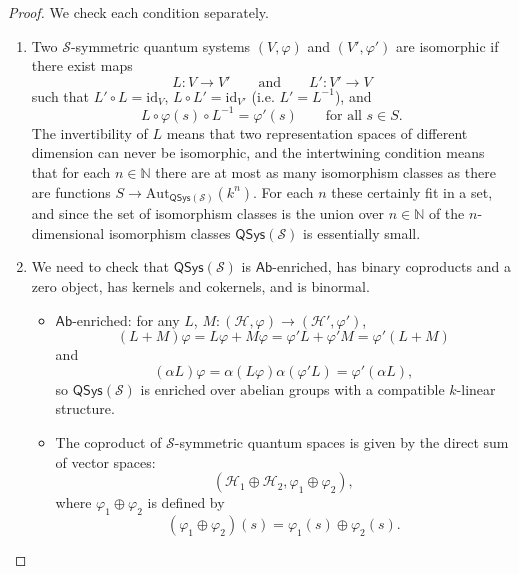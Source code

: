 \documentclass[a4paper,10pt]{scrreprt}
\newcommand{\N}{\mathbb{N}}
\newcommand{\Aut}{\mathrm{Aut}}
\theoremstyle{definition}
\theoremstyle{plain}
\theoremstyle{remark}
\begin{document}
\begin{proof}
  We check each condition separately.
  \begin{enumerate}
    \item Two $\mathcal{S}$-symmetric quantum systems $(V, \varphi)$ and $(V', \varphi')$ are isomorphic if there exist maps 
      \begin{equation*}
        L\colon V \to V' \qquad\text{and}\qquad L'\colon V' \to V
      \end{equation*}
      such that $L' \circ L = \mathrm{id}_{V}$, $L \circ L' = \mathrm{id}_{V'}$ (i.e. $L' = L^{-1}$), and
      \begin{equation*}
        L \circ \varphi(s) \circ L^{-1} = \varphi'(s)\qquad \text{for all }s \in S.
      \end{equation*}
      The invertibility of $L$ means that two representation spaces of different dimension can never be isomorphic, and the intertwining condition means that for each $n \in \N$ there are at most as many isomorphism classes as there are functions $S \to \Aut_{\mathsf{QSys}(\mathcal{S})}(k^{n})$. For each $n$ these certainly fit in a set, and since the set of isomorphism classes is the union over $n \in \N$ of the $n$-dimensional isomorphism classes $\mathsf{QSys}(\mathcal{S})$ is essentially small.

    \item We need to check that $\mathsf{QSys}(\mathcal{S})$ is $\mathsf{Ab}$-enriched, has binary coproducts and a zero object, has kernels and cokernels, and is binormal.
      \begin{itemize}
        \item $\mathsf{Ab}$-enriched: for any $L$, $M\colon (\mathscr{H}, \varphi) \to (\mathscr{H}', \varphi')$, 
          \begin{equation*}
            (L+M)\varphi = L\varphi + M\varphi = \varphi'L + \varphi'M = \varphi'(L+M)
          \end{equation*}
          and
          \begin{equation*}
            (\alpha L)\varphi = \alpha (L\varphi) \alpha(\varphi'L) = \varphi' (\alpha L),
          \end{equation*}
          so $\mathsf{QSys}(\mathcal{S})$ is enriched over abelian groups with a compatible $k$-linear structure.

        \item The coproduct of $\mathcal{S}$-symmetric quantum spaces is given by the direct sum of vector spaces:
          \begin{equation*}
            (\mathscr{H}_{1} \oplus \mathscr{H}_{2}, \varphi_{1} \oplus \varphi_{2}),
          \end{equation*}
          where $\varphi_{1} \oplus \varphi_{2}$ is defined by
          \begin{equation*}
            (\varphi_{1} \oplus \varphi_{2})(s) = \varphi_{1}(s) \oplus \varphi_{2}(s).
          \end{equation*}


\end{itemize}
\end{enumerate}
\end{proof}
\end{document}
